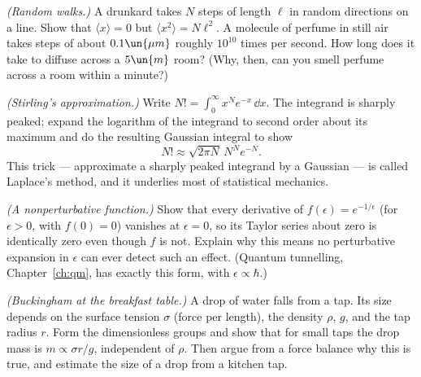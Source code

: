 \begin{problems}
\core \emph{(Random walks.)} A drunkard takes $N$ steps of length $\ell$ in random directions on a line. Show that $\langle x\rangle = 0$ but $\langle x^2\rangle = N\ell^2$. A molecule of perfume in still air takes steps of about $0.1\un{\mu m}$ roughly $10^{10}$ times per second. How long does it take to diffuse across a $5\un{m}$ room? (Why, then, can you smell perfume across a room within a minute?)

\core \emph{(Stirling's approximation.)} Write $N! = \int_0^\infty x^{N}e^{-x}\,\dd x$. The integrand is sharply peaked; expand the logarithm of the integrand to second order about its maximum and do the resulting Gaussian integral to show
\[
  N! \approx \sqrt{2\pi N}\,N^{N}e^{-N}.
\]
This trick --- approximate a sharply peaked integrand by a Gaussian --- is called Laplace's method, and it underlies most of statistical mechanics.

 \emph{(A nonperturbative function.)} Show that every derivative of $f(\epsilon) = e^{-1/\epsilon}$ (for $\epsilon>0$, with $f(0)=0$) vanishes at $\epsilon = 0$, so its Taylor series about zero is identically zero even though $f$ is not. Explain why this means no perturbative expansion in $\epsilon$ can ever detect such an effect. (Quantum tunnelling, Chapter~\ref{ch:qm}, has exactly this form, with $\epsilon\propto\hbar$.)

 \emph{(Buckingham at the breakfast table.)} A drop of water falls from a tap. Its size depends on the surface tension $\sigma$ (force per length), the density $\rho$, $g$, and the tap radius $r$. Form the dimensionless groups and show that for small taps the drop mass is $m\propto \sigma r/g$, independent of $\rho$. Then argue from a force balance why this is true, and estimate the size of a drop from a kitchen tap.
\end{problems}

\begin{reading}
\end{reading}
